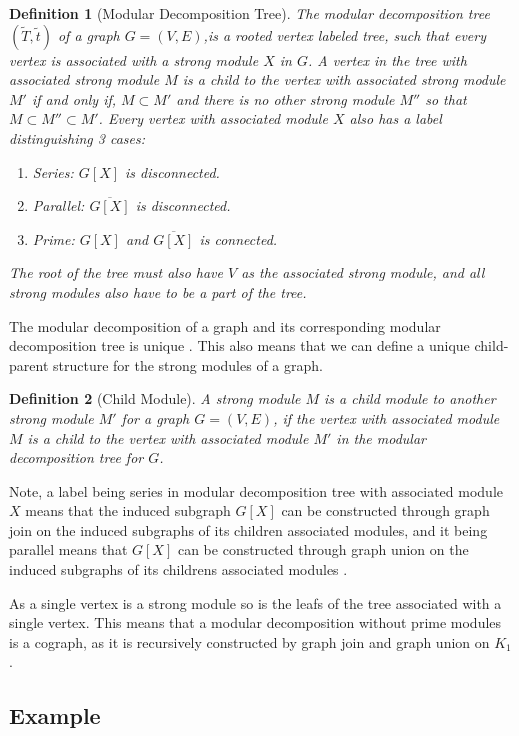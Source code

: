\documentclass[a4paper]{article}
\newtheorem{definition}{Definition}[section]
\newcommand{\T}{\widetilde{T}}
\renewcommand{\t}{\widetilde{t}}
\begin{document}
\begin{definition}[Modular Decomposition Tree]{\cite{MDTree}}
    The modular decomposition tree $(\T,\t)$ of a graph $G = (V,E)$,is a rooted
    vertex labeled tree, such that every vertex is associated with a strong
    module $X$ in $G$.  A vertex in the tree with associated strong module $M$
    is a child to the vertex with associated strong module $M'$ if and only if,
    $M \subset M'$ and there is no other strong module $M''$ so that $M \subset
    M'' \subset M'$. Every vertex with associated module $X$ also has a label
    distinguishing 3 cases:
    \begin{enumerate}
        \item Series: $G[X]$ is disconnected.
        \item Parallel: $\overline{G[X]}$ is disconnected.
        \item Prime: $G[X]$ and $\overline{G[X]}$ is connected.
    \end{enumerate}
    The root of the tree must also have $V$ as the associated strong module, and all 
    strong modules also have to be a part of the tree.
\end{definition}
The modular decomposition of a graph and its corresponding modular
decomposition tree is unique \cite{MDUnique}. This also means that we can 
define a unique child-parent structure for the strong modules of a graph.

\begin{definition}[Child Module]
    A strong module $M$ is a child module to another strong module $M'$ for a
    graph $G = (V,E)$, if the vertex with associated module $M$ is a child to
    the vertex with associated module $M'$ in the modular decomposition tree for
    $G$.
\end{definition}

Note, a label being series in modular decomposition tree with associated module
$X$ means that the induced subgraph $G[X]$ can be constructed through graph
join on the induced subgraphs of its children associated modules, and it being
parallel means that $G[X]$ can be constructed through graph union on the
induced subgraphs of its childrens associated modules \cite{HCL}.

As a single vertex is a strong module so is the leafs of the tree associated
with a single vertex. This means that a modular decomposition without
prime modules is a cograph, as it is recursively constructed by graph join and
graph union on $K_1$.


\subsection{Example}
\end{document}
